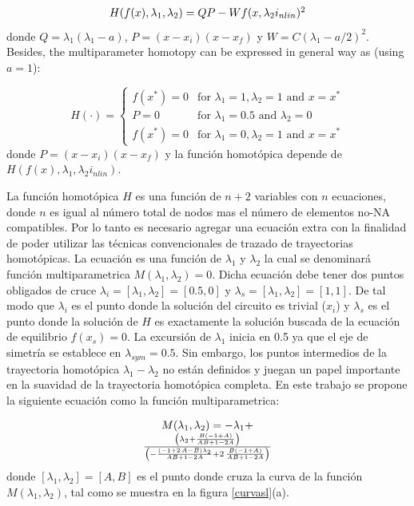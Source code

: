 \documentclass[conference,letterpaper,twocolumn]{IEEEtran}
\begin{document}
\begin{equation}
{\small
\begin{array}{l}
H(f(x),\lambda_1, \lambda_2 )=QP - Wf(x,\lambda_2i_{nlin})^2
\end{array}}
\label{homotopiaPx3}
\end{equation}
donde $Q=\lambda_1(\lambda_1-a)$, $P=(x-x_i)(x-x_f)$ y $W=C(\lambda_1-a/2)^2$. Besides, the
multiparameter homotopy can be expressed in general way as (using $a=1$):

{\small
\begin{displaymath}
{H}(\cdot)= \left\{\begin{array}{rl}
f(x^*)=0 & \textrm{for  $\lambda_1=1, \lambda_2=1$ and $x=x^*$}\\
P=0 & \textrm{for $\lambda_1=0.5$ and $\lambda_2=0$}\\
f(x^*)=0 & \textrm{for $\lambda_1=0, \lambda_2=1$ and $x=x^*$}
\end{array}\right.
\end{displaymath}
}
donde $P=(x-x_i)(x-x_f)$ y la función homotópica depende de ${H}({f}({x}),\lambda_1,\lambda_2{i_{nlin}})$.



La función homot\'opica ${H}$ es una función de $n+2$ variables con $n$ ecuaciones, donde $n$ es igual al n\'umero total de nodos
mas el n\'umero de elementos no-NA compatibles. Por lo tanto es necesario agregar una ecuación extra con la finalidad
de poder utilizar las técnicas convencionales de trazado de trayectorias homot\'opicas\cite{homo_allgower}. 
La ecuación es una función de $\lambda_1$ y $\lambda_2$ la cual se denominará función multiparametrica $M(\lambda_1,\lambda_2)=0$.
Dicha ecuación debe tener dos puntos obligados de cruce ${\lambda}_i=[\lambda_1,\lambda_2]=[0.5,0]$ y ${\lambda}_s=[\lambda_1,\lambda_2]=[1,1]$. De tal modo que ${\lambda}_i$ es el punto donde la solución del circuito es trivial ($x_i$) y  ${\lambda}_s$
es el punto donde la solución de ${H}$ es exactamente la solución buscada de la ecuación de equilibrio ${f}({x}_s)=0$.
La excursión de $\lambda_1$ inicia en 0.5 ya que el eje de simetría
se establece en $\lambda_{sym}=0.5$. Sin embargo, los puntos intermedios de la trayectoria homotópica $\lambda_1-\lambda_2$ no están definidos y juegan un papel
importante en la suavidad de la trayectoria homot\'opica completa. En este trabajo se propone la siguiente ecuación como la función multiparametrica:

{
\begin{equation}
\begin{array}{c}
M(\lambda_1,\lambda_2)=-\lambda_{{1}}+\\ { \left( \lambda_{{2}}+{\frac {B \left( - 1+A \right) }
{AB+ 1- 2A}} \right) \over  \left( -{\frac { \left( - 1+ 2\,
A- B \right) \lambda_{{2}}}{AB+ 1- 2A}}+ 2\,{\frac {B
 \left( - 1+A \right) }{AB+ 1- 2A}} \right) }
\end{array}
\label{homotopiaPx4}
\end{equation}
}
donde $[\lambda_1,\lambda_2]=[A,B]$ es el punto donde cruza la curva de la funci\'on  $M(\lambda_1,\lambda_2)$,
tal como se muestra en la figura \ref{curvasl}(a).
\end{document}
